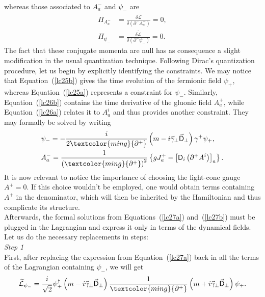 whereas those associated to $A_a^-$ and $\psi_-$ are
\begin{align*}
\Pi_{A_a^-}&=\frac{\delta\widetilde{\mathcal{L}}}{\delta\left(\partial^-A_a^-\right)}=0,\\
\Pi_{\psi_-}&=\frac{\delta\widetilde{\mathcal{L}}}{\delta\left(\partial^-\psi_-\right)}=0.
\end{align*}
The fact that these conjugate momenta are null has as consequence a slight modification in the usual quantization technique. Following Dirac's \cite{dirac} quantization procedure, let us begin by explicitly identifying the constraints. We may notice that Equation~(\cref{lc25b}) gives the time evolution of the fermionic field $\psi_+$, whereas Equation~(\cref{lc25a}) represents a constraint for $\psi_-$. Similarly, Equation~(\cref{lc26b}) contains the time derivative of the gluonic field $A_a^+$, while Equation~(\cref{lc26a}) relates it to $A_a^i$ and thus provides another constraint. They may formally be solved by writing
\begin{subequations}
\begin{align}
&\psi_-=-\frac{i}{2\textcolor{ming}{\partial^+}}\left(m-i\vec{\gamma}_\perp\vec{\textsf{D}}_\perp\right)\gamma^+\psi_+,\label{lc27a}\\
&A_a^-=\frac{1}{\left(\textcolor{ming}{\partial^+}\right)^2}\left\lbrace gJ_a^+-\left[\textsf{D}_i\left(\partial^+A^i\right)\right]_a\right\rbrace\label{lc27b}.
\end{align}
\end{subequations}
It is now relevant to notice the importance of choosing the light-cone gauge $A^+=0$. If this choice wouldn't be employed, one would obtain terms containing $A^+$ in the denominator, which will then be inherited by the Hamiltonian and thus complicate its structure.\\ \noindent
Afterwards, the formal solutions from Equations~(\cref{lc27a}) and~(\cref{lc27b}) must be plugged in the Lagrangian and express it only in terms of the dynamical fields. Let us do the necessary replacements in steps:\\

{\color{ming}\textit{\sffamily Step 1}}\\ 
\noindent
First, after replacing the expression from Equation~(\cref{lc27a}) back in all the terms of the Lagrangian containing $\psi_-$, we will get
\begin{align}\label{lc31}
\widetilde{\mathcal{L}}_{\psi_-}=\frac{i}{\sqrt{2}}\psi_+^\dag\left(m-i\vec{\gamma}_\perp\vec{\textsf{D}}_\perp\right)\frac{1}{\textcolor{ming}{\partial^+}}\left(m+i\vec{\gamma}_\perp\vec{\textsf{D}}_\perp\right)\psi_+.
\end{align}
 
